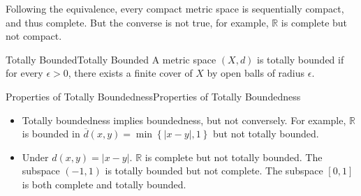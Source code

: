 \documentclass[../main.tex]{subfiles}
\begin{document}
Following the equivalence, every compact metric space is sequentially compact, and thus complete. But the converse is not true, for example, $\mathbb{R}$ is complete but not compact.

\begin{definition}{Totally Bounded}{Totally Bounded}
	A metric space $(X,d)$ is totally bounded if for every $\epsilon > 0$, there exists a finite cover of $X$ by open balls of radius $\epsilon$.
\end{definition}

\begin{proposition}{Properties of Totally Boundedness}{Properties of Totally Boundedness}
	\begin{itemize}
		\item Totally boundedness implies boundedness, but not conversely. For example, $\mathbb{R}$ is bounded in $\overline{d}(x,y) = \min \left\{ \left|x-y\right|,1 \right\}$ but not totally bounded.
		\item Under $d(x,y) = \left|x-y\right|$. $\mathbb{R}$ is complete but not totally bounded. The subspace $(-1,1)$ is totally bounded but not complete. The subspace $[0,1]$ is both complete and totally bounded.
	\end{itemize}
\end{proposition}
\end{document}
